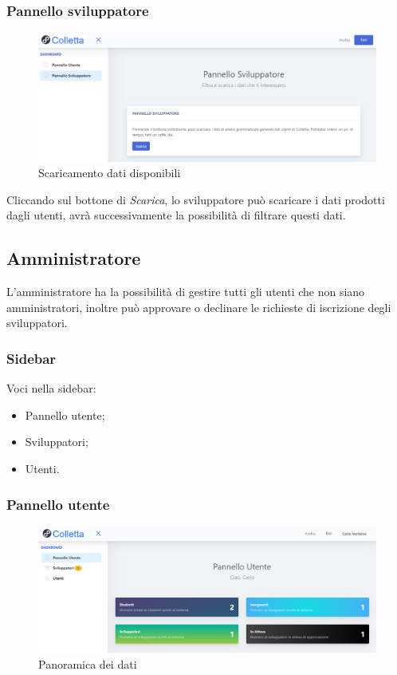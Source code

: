     	\subsubsection{Pannello sviluppatore}
    		\begin{figure}[H]
				\centering
				\includegraphics[width=17cm]{sez/img/sviluppatore/datipronti.png}
				\caption{Scaricamento dati disponibili}\label{fig:1}
			\end{figure}
		  Cliccando sul bottone di \textit{Scarica}, lo sviluppatore può scaricare i dati prodotti dagli utenti, avrà successivamente la possibilità di filtrare questi dati.




	\newpage
	\subsection{Amministratore}
	L'amministratore ha la possibilità di gestire tutti gli utenti che non siano amministratori, inoltre può approvare o declinare le richieste di iscrizione degli sviluppatori.
		\subsubsection{Sidebar}
		  Voci nella sidebar:
			\begin{itemize}
				\item Pannello utente;
				\item Sviluppatori;
				\item Utenti.
			\end{itemize}



		\subsubsection{Pannello utente}
			\begin{figure}[H]
				\centering
				\includegraphics[width=17cm]{sez/img/amministratore/panelloadmin.PNG}
				\caption{Panoramica dei dati}\label{fig:1}
			\end{figure}
		

